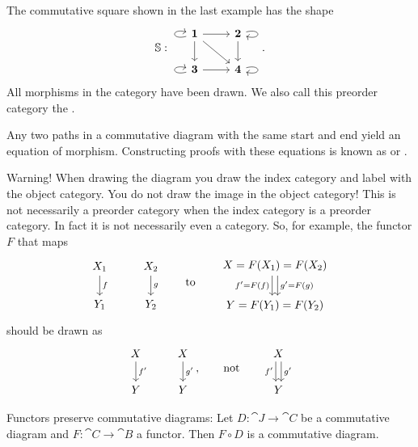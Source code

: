 \begin{example}
The commutative square shown in the last example has the shape
\[ \mathbb{S}: \begin{tikzcd}
\bm{1} \ar[loop left] \ar[r] \ar[dr] \ar[d] & \bm{2} \ar[d] \ar[loop right] \\
\bm{3} \ar[loop left] \ar[r] & \bm{4} \ar[loop right]
\end{tikzcd}. \]
All morphisms in the category have been drawn. We also call this preorder category the .
\end{example}

Any two paths in a commutative diagram with the same start and end yield an equation of morphism. Constructing proofs with these equations is known as  or .

\begin{example}
Warning! When drawing the diagram you draw the index category and label with the object category. You do not draw the image in the object category! This is not necessarily a preorder category when the index category is a preorder category. In fact it is not necessarily even a category. So, for example, the functor $F$ that maps
\[ \begin{tikzcd}
X_1 \dar{f} & X_2 \dar{g} \\ Y_1 & Y_2
\end{tikzcd} \qquad\text{to}\qquad \begin{tikzcd}
X = F(X_1) = F(X_2) \ar[d, shift right, swap, "f' = F(f)"] \ar[d, shift left, "g' = F(g)"] \\ Y = F(Y_1) = F(Y_2)
\end{tikzcd}  \]
should be drawn as
\[ \begin{tikzcd}
X \dar{f'} & X \dar{g'} \\ Y & Y
\end{tikzcd}, \qquad\text{not}\qquad \begin{tikzcd}
X \ar[d, swap, shift right, "f'"] \ar[d, shift left, "g'"] \\ Y
\end{tikzcd} \]
\end{example}

\begin{lemma}
Functors preserve commutative diagrams: Let $D:\cat{J}\to \cat{C}$ be a commutative diagram and $F:\cat{C}\to \cat{B}$ a functor. Then $F\circ D$ is a commutative diagram.
\end{lemma}

